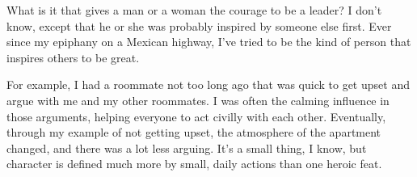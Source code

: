 \documentclass[onecolumn, 11pt]{article}
\begin{document}
What is it that gives a man or a woman the courage to be a leader?  I don't
know, except that he or she was probably inspired by someone else first. Ever
since my epiphany on a Mexican highway, I've tried to be the kind of person
that inspires others to be great.  

For example, I had a roommate not too long ago that was quick to get upset and
argue with me and my other roommates.  I was often the calming influence in
those arguments, helping everyone to act civilly with each other.  Eventually,
through my example of not getting upset, the atmosphere of the apartment
changed, and there was a lot less arguing.  It's a small thing, I know, but
character is defined much more by small, daily actions than one heroic feat.
\end{document}
